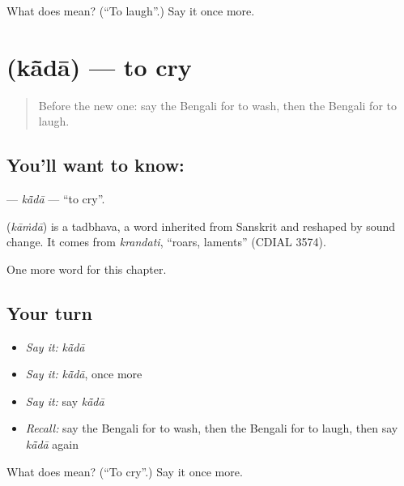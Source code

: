 \begin{tcolorbox}[breakable,colback=teal!4,colframe=teal!35!black,title={Before you move on}]
What does  mean? (\textquotedblleft{}To laugh\textquotedblright{}.) Say it once more.
\end{tcolorbox}
\section[\texorpdfstring{\bn{কাঁদা} (kā̃dā)}{কাঁদা (kā̃dā)}]{ (kā̃dā) — to cry}

\label{lesson:BN-C50-kada}



\begin{quote}
Before the new one: say the Bengali for to wash, then the Bengali for to laugh.
\end{quote}

\subsection*{You'll want to know: }
\textbf{} — \emph{kā̃dā} — \textquotedblleft{}to cry\textquotedblright{}.

\begin{cousinweb}
\textbf{} (\emph{kāṁdā}) is a tadbhava, a word inherited from Sanskrit and reshaped by sound change. It comes from \emph{krandati}, \textquotedblleft{}roars, laments\textquotedblright{} (CDIAL 3574).
\end{cousinweb}

\begin{grammarlens}[title={What you've built}]
One more word for this chapter.
\end{grammarlens}

\subsection*{Your turn}
\begin{itemize}
\raggedright
  \item \emph{Say it:} \emph{kā̃dā}
  \item \emph{Say it:} \emph{kā̃dā}, once more
  \item \emph{Say it:} say \emph{kā̃dā}
  \item \emph{Recall:} say the Bengali for to wash, then the Bengali for to laugh, then say \emph{kā̃dā} again
\end{itemize}

\begin{tcolorbox}[breakable,colback=teal!4,colframe=teal!35!black,title={Before you move on}]
What does  mean? (\textquotedblleft{}To cry\textquotedblright{}.) Say it once more.
\end{tcolorbox}
